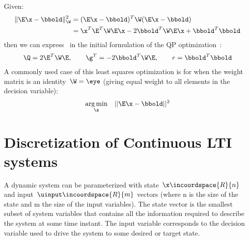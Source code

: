 Given:
\begin{align}
  \|\E \x-\bbold\|_{\W}^{2} &=(\E \x-\bbold)^{T}\W(\E \x-\bbold) \\
                            &=\x^{T} \E^{T}\W\E \x
                              -2 \bbold^{T}\W \E \x
                              +\bbold^{T} \bbold
\end{align}
then we can express~ in the initial formulation of the QP optimization~:
\begin{gather}
  \Q = 2\E^{T} \W \E, \qquad
  \g^T = -2 \bbold^{T} \W \E, \qquad
  r = \bbold^{T} \bbold
\end{gather}
A commonly used case of this least squares optimization is for when the weight
matrix is an identity~${\W=\eye}$ (giving equal weight to all elements in the
decision variable):
\begin{gather}
  \underset{\x}{\arg \min }\quad ||\E\x - \bbold||^2
\end{gather}

\chapter{Discretization of Continuous LTI systems}
\label{sec:discretization_lti}

A dynamic system can be parameterized with state~${\x\incoordspace{R}{n}}$ and
input~${\uinput\incoordspace{R}{m}}$ vectors (where n is the size of the state
and m the size of the input variables). The state vector is the smallest subset
of system variables that contains all the information required to describe the
system at some time instant. The input variable corresponds to the decision
variable used to drive the system to some desired or target state.


